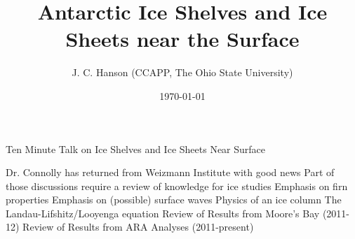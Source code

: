 \documentclass{beamer}
\title{Antarctic Ice Shelves and Ice Sheets near the Surface}
\date{\today}
\author{J. C. Hanson (CCAPP, The Ohio State University)}
\institute{CCAPP @ OSU}
\begin{document}
 \maketitle
\small

\begin{frame}{Ten Minute Talk on Ice Shelves and Ice Sheets Near Surface}
\begin{outline}[enumerate]
\1 Dr. Connolly has returned from Weizmann Institute with good news
\1 Part of those discussions require a review of knowledge for ice studies
\2 Emphasis on firn properties
\2 Emphasis on (possible) surface waves
\1 Physics of an ice column
\1 The Landau-Lifshitz/Looyenga equation
\1 Review of Results from Moore's Bay (2011-12)
\1 Review of Results from ARA Analyses (2011-present)
\end{outline}
\end{frame}
\end{document}
